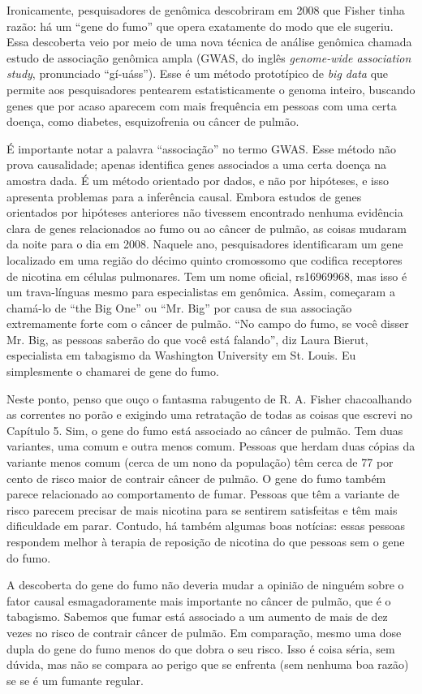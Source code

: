 \documentclass[11pt,a5paper,twoside]{book}
\begin{document}
Ironicamente, pesquisadores de genômica descobriram em 2008 que Fisher tinha razão: há um “gene do fumo” que opera exatamente do modo que ele sugeriu. Essa descoberta veio por meio de uma nova técnica de análise genômica chamada estudo de associação genômica ampla (GWAS, do inglês \textit{genome-wide association study}, pronunciado “gí-uáss”). Esse é um método prototípico de \textit{big data} que permite aos pesquisadores pentearem estatisticamente o genoma inteiro, buscando genes que por acaso aparecem com mais frequência em pessoas com uma certa doença, como diabetes, esquizofrenia ou câncer de pulmão.

É importante notar a palavra “associação” no termo GWAS. Esse método não prova causalidade; apenas identifica genes associados a uma certa doença na amostra dada. É um método orientado por dados, e não por hipóteses, e isso apresenta problemas para a inferência causal. Embora estudos de genes orientados por hipóteses anteriores não tivessem encontrado nenhuma evidência clara de genes relacionados ao fumo ou ao câncer de pulmão, as coisas mudaram da noite para o dia em 2008. Naquele ano, pesquisadores identificaram um gene localizado em uma região do décimo quinto cromossomo que codifica receptores de nicotina em células pulmonares. Tem um nome oficial, rs16969968, mas isso é um trava-línguas mesmo para especialistas em genômica. Assim, começaram a chamá-lo de “the Big One” ou “Mr. Big” por causa de sua associação extremamente forte com o câncer de pulmão. “No campo do fumo, se você disser Mr. Big, as pessoas saberão do que você está falando”, diz Laura Bierut, especialista em tabagismo da Washington University em St. Louis. Eu simplesmente o chamarei de gene do fumo.

Neste ponto, penso que ouço o fantasma rabugento de R. A. Fisher chacoalhando as correntes no porão e exigindo uma retratação de todas as coisas que escrevi no Capítulo 5. Sim, o gene do fumo está associado ao câncer de pulmão. Tem duas variantes, uma comum e outra menos comum. Pessoas que herdam duas cópias da variante menos comum (cerca de um nono da população) têm cerca de 77 por cento de risco maior de contrair câncer de pulmão. O gene do fumo também parece relacionado ao comportamento de fumar. Pessoas que têm a variante de risco parecem precisar de mais nicotina para se sentirem satisfeitas e têm mais dificuldade em parar. Contudo, há também algumas boas notícias: essas pessoas respondem melhor à terapia de reposição de nicotina do que pessoas sem o gene do fumo.

A descoberta do gene do fumo não deveria mudar a opinião de ninguém sobre o fator causal esmagadoramente mais importante no câncer de pulmão, que é o tabagismo. Sabemos que fumar está associado a um aumento de mais de dez vezes no risco de contrair câncer de pulmão. Em comparação, mesmo uma dose dupla do gene do fumo menos do que dobra o seu risco. Isso é coisa séria, sem dúvida, mas não se compara ao perigo que se enfrenta (sem nenhuma boa razão) se se é um fumante regular.
\end{document}
